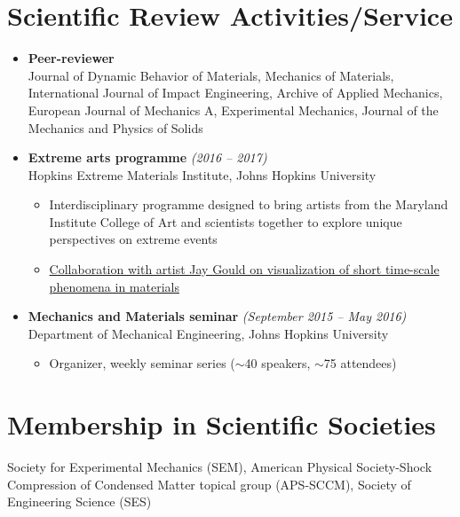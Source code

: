 \documentclass[a4paper,10pt, oneside]{article}
\begin{document}
	\section*{{Scientific Review Activities/Service}}
	\begin{itemize}[wide, labelwidth=!, labelindent=-1em]
		\item[] \textbf{Peer-reviewer} \\
		Journal of Dynamic Behavior of Materials, Mechanics of Materials, International Journal of Impact Engineering, Archive of Applied Mechanics, European Journal of Mechanics A, Experimental Mechanics, Journal of the Mechanics and Physics of Solids
		\vspace*{0.5em}
		\item[]\textbf{Extreme arts programme} \hfill \textit{(2016 -- 2017)} \\
		Hopkins Extreme Materials Institute, Johns Hopkins University
		\begin{itemize}[wide, labelwidth=!, labelindent=0em]
			\item Interdisciplinary programme designed to bring artists from the Maryland Institute College of Art and scientists together to explore unique perspectives on extreme events
			\item \href{https://www.youtube.com/watch?v=SQUqKc2duXA&feature=youtu.be&ab_channel=HEMI-HopkinsExtremeMaterialsInstitute}{Collaboration with artist Jay Gould on visualization of short time-scale phenomena in materials}
		\end{itemize}
		\vspace*{0.5em}
		\item[]\textbf{Mechanics and Materials seminar} \hfill \textit{(September 2015 -- May 2016)} \\
		Department of Mechanical Engineering, Johns Hopkins University
		\begin{itemize}[wide, labelwidth=!, labelindent=0em]
			\item Organizer, weekly seminar series ($\sim$40 speakers, $\sim$75 attendees)
		\end{itemize}
	\end{itemize}
	
	\section*{{Membership in Scientific Societies}}
	Society for Experimental Mechanics (SEM), American Physical Society-Shock Compression of Condensed Matter topical group (APS-SCCM), Society of Engineering Science (SES) 
		
\end{document}
